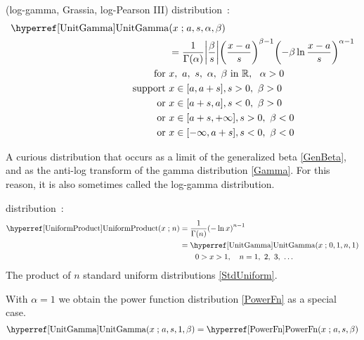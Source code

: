 

\subpart{~} %

\label{sec:UnitGamma}
 (log-gamma, Grassia, log-Pearson III) distribution~\cite{Olshen1938,Consul1971,Grassia1977,Gupta2004}:
\begin{align}
\label{UnitGamma}
\opr{UnitGamma}&(x\given a, s,\alpha,\beta) \\ \notag &= \frac{1}{\Gamma(\alpha)} \Left|\frac{\beta}{ s}\Right|
\Left(\frac{x-a}{s}\Right)^{\beta-1} \Left(-\beta \ln   \frac{x-a}{s} \Right)^{\alpha-1}  \checked
\notag
\\ \text{for }& x,\ a,\ s,\ \alpha,\ \beta \text{ in } \mathbb{R},\ \ \alpha >0
\notag
 \\ \text{ support } & x \in [a,a+s], s>0,\ \beta>0 \notag \\ \text{ or } &  x\in[a+s,a], s<0,\ \beta>0 
 \notag 
 \\  \notag  \text{ or } &  x\in[a+s,+\infty], s>0,\ \beta<0 
 \\  \notag  \text{ or } &  x\in[-\infty,a+s], s<0,\ \beta<0 
\end{align}

A curious distribution that occurs as a limit of the generalized beta \eqref{GenBeta}, and as the anti-log transform of the gamma distribution \eqref{Gamma}. For this reason, it is also sometimes called the log-gamma distribution.





 distribution~\cite{Springer1979a}:
\begin{align}
\label{UniformProduct}
\opr{UniformProduct}(x\given n) &=  \frac{1}{\Gamma(n)} \Left( -\ln x \Right)^{n-1} 	\checked
 \\ \notag & = \opr{UnitGamma}(x\given 0, 1,n,1)							\checked
 \\ \notag & \qquad 0>x>1, \quad n = 1,\ 2,\ 3,\ \ldots							\checked
\end{align}
The product of $n$ standard uniform distributions \eqref{StdUniform}.



With  $\alpha=1$ we obtain the power function distribution \eqref{PowerFn} as a special case.
\[
\opr{UnitGamma}(x\given a, s,1,\beta) = \opr{PowerFn}(x\given a,s,\beta) \checked \notag
\]

